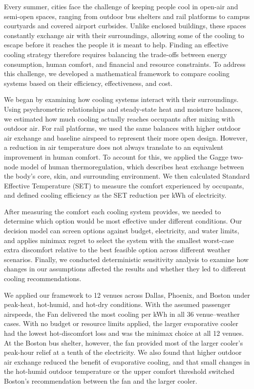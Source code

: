 \noindent\hspace*{\parindent}Every summer, cities face the challenge of keeping people cool in open-air and semi-open spaces, ranging from outdoor bus shelters and rail platforms to campus courtyards and covered airport curbsides. Unlike enclosed buildings, these spaces constantly exchange air with their surroundings, allowing some of the cooling to escape before it reaches the people it is meant to help. Finding an effective cooling strategy therefore requires balancing the trade-offs between energy consumption, human comfort, and financial and resource constraints. To address this challenge, we developed a mathematical framework to compare cooling systems based on their efficiency, effectiveness, and cost.

We began by examining how cooling systems interact with their surroundings. Using psychrometric relationships and steady-state heat and moisture balances, we estimated how much cooling actually reaches occupants after mixing with outdoor air. For rail platforms, we used the same balances with higher outdoor air exchange and baseline airspeed to represent their more open design. However, a reduction in air temperature does not always translate to an equivalent improvement in human comfort. To account for this, we applied the Gagge two-node model of human thermoregulation, which describes heat exchange between the body’s core, skin, and surrounding environment. We then calculated Standard Effective Temperature (SET) to measure the comfort experienced by occupants, and defined cooling efficiency as the SET reduction per kWh of electricity.

After measuring the comfort each cooling system provides, we needed to determine which option would be most effective under different conditions. Our decision model can screen options against budget, electricity, and water limits, and applies minimax regret to select the system with the smallest worst-case extra discomfort relative to the best feasible option across different weather scenarios. Finally, we conducted deterministic sensitivity analysis to examine how changes in our assumptions affected the results and whether they led to different cooling recommendations.

We applied our framework to 12 venues across Dallas, Phoenix, and Boston under peak-heat, hot-humid, and hot-dry conditions. With the assumed passenger airspeeds, the Fan delivered the most cooling per kWh in all 36 venue–weather cases. With no budget or resource limits applied, the larger evaporative cooler had the lowest hot-discomfort loss and was the minimax choice at all 12 venues. At the Boston bus shelter, however, the fan provided most of the larger cooler’s peak-hour relief at a tenth of the electricity. We also found that higher outdoor air exchange reduced the benefit of evaporative cooling, and that small changes in the hot-humid outdoor temperature or the upper comfort threshold switched Boston’s recommendation between the fan and the larger cooler.

